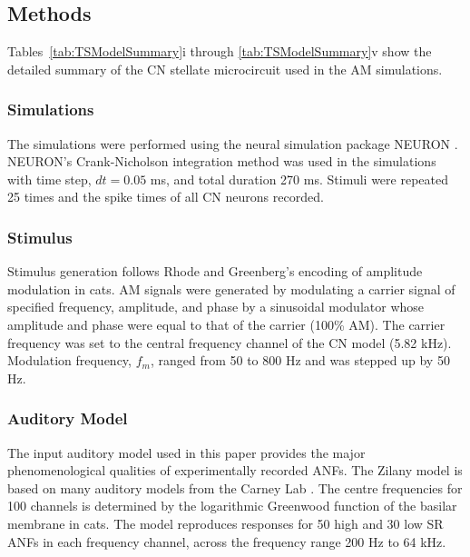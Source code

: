 %

\subsection{Methods}

Tables~\ref{tab:TSModelSummary}i through \ref{tab:TSModelSummary}v
show the detailed summary of the CN stellate microcircuit used in
the AM simulations.

\subsubsection{Simulations}

The simulations were performed using the neural simulation package
NEURON \cite{CarnevaleHines:2006}. NEURON's Crank-Nicholson
integration method was used in the simulations with time step, $dt=
0.05$ ms, and total duration 270 ms. Stimuli were repeated 25 times
and the spike times of all CN neurons recorded.

\subsubsection{Stimulus}

Stimulus generation follows Rhode and Greenberg's
\cite{RhodeGreenberg:1994} encoding of amplitude modulation in
cats.  AM signals were generated by modulating a carrier signal of
specified frequency, amplitude, and phase by a sinusoidal modulator
whose amplitude and phase were equal to that of the carrier (100\%
AM). The carrier frequency was set to the central frequency channel
of the CN model (5.82 kHz).  Modulation frequency, $f_m$, ranged
from 50 to 800 Hz and was stepped up by 50 Hz.

\subsubsection{Auditory Model}

The input auditory model used in this paper provides the major
phenomenological qualities of experimentally recorded ANFs. The
Zilany model \cite{ZilanyBruceEtAl:2009} is based on many auditory
models from the Carney Lab
\cite{HeinzColburnEtAl:2001,ZhangCarney:2001,Carney:1993}. The
centre frequencies for 100 channels is determined by the logarithmic
Greenwood function \cite{Greenwood:1990} of the basilar membrane in
cats. The model reproduces responses for 50 high and 30 low SR ANFs
in each frequency channel, across the frequency range 200 Hz to 64
kHz.


